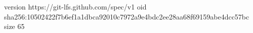 version https://git-lfs.github.com/spec/v1
oid sha256:10502422f7b6ef1a1dbca92010c7972a9e4bdc2ee28aa68f69159abe4dcc57bc
size 65
